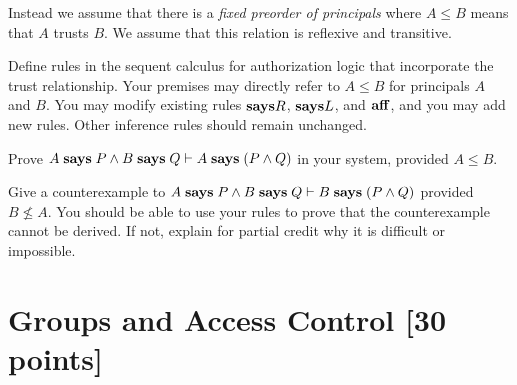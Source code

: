 \documentclass[11pt]{article}
\begin{document}
Instead we assume that there is a \emph{fixed preorder of principals} where
$A \leq B$ means that $A$ trusts $B$.  We assume that this relation is reflexive
and transitive.

\begin{task}[15 pts]\rm
  Define rules in the sequent calculus for authorization logic that incorporate
  the trust relationship.  Your premises may directly refer to $A \leq B$ for
  principals $A$ and $B$.  You may modify existing rules ${\mathrel{\mathbf{says}}}R$, ${\mathrel{\mathbf{says}}}L$,
  and ${\mathrel{\mathbf{aff}}}$, and you may add new rules.  Other inference rules should
  remain unchanged.
\end{task}

\begin{task}[5 pts]\rm
  Prove $A \mathrel{\mathbf{says}} P \land B \mathrel{\mathbf{says}} Q \vdash A \mathrel{\mathbf{says}} (P \land Q)$ in your system,
  provided $A \leq B$.
\end{task}

\begin{task}[10 pts]\rm
  Give a counterexample to
  $A \mathrel{\mathbf{says}} P \land B \mathrel{\mathbf{says}} Q \vdash B \mathrel{\mathbf{says}} (P \land Q)$ provided
  $B \not\leq A$.  You should be able to use your rules to prove that the
  counterexample cannot be derived.  If not, explain for partial credit why it
  is difficult or impossible.
\end{task}

\section{Groups and Access Control [30 points]}
\end{document}

